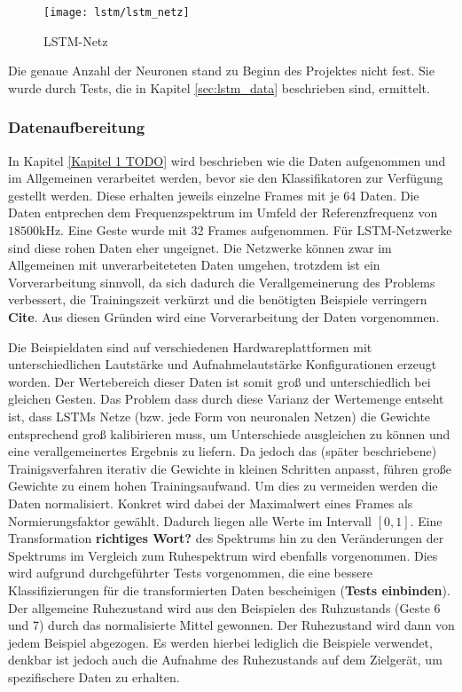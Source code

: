 \begin{figure}[htbp]
    \centering
   \texttt{[image: lstm/lstm\_netz]}
\caption{LSTM-Netz}
\label{fig:lstm_netz}
\end{figure}
Die genaue Anzahl der Neuronen stand zu Beginn des Projektes nicht fest. 
Sie wurde durch Tests, die in Kapitel \autoref{sec:lstm_data} beschrieben sind, ermittelt.

\subsubsection{Datenaufbereitung}
\label{sec:lstm_data}

In Kapitel \ref{Kapitel 1 TODO} wird beschrieben wie die Daten aufgenommen und
im Allgemeinen verarbeitet werden, bevor sie den Klassifikatoren zur
Verfügung gestellt werden. Diese erhalten jeweils einzelne Frames mit je 64
Daten. Die Daten entprechen dem Frequenzspektrum im Umfeld der
Referenzfrequenz von $18500\text{kHz}$. Eine Geste wurde mit 32 Frames
aufgenommen. Für \ac{LSTM}-Netzwerke sind diese rohen Daten eher ungeignet. Die
Netzwerke können zwar im Allgemeinen mit unverarbeiteteten Daten umgehen,
trotzdem ist ein Vorverarbeitung sinnvoll, da sich dadurch die Verallgemeinerung
des Problems verbessert, die Trainingszeit verkürzt und die benötigten Beispiele
verringern \textbf{Cite}. Aus diesen Gründen wird eine Vorverarbeitung der Daten
vorgenommen. 

Die Beispieldaten sind auf verschiedenen Hardwareplattformen mit
unterschiedlichen Lautstärke und Aufnahmelautstärke Konfigurationen erzeugt
worden. Der Wertebereich dieser Daten ist somit groß und unterschiedlich bei
gleichen Gesten. Das Problem dass durch diese Varianz der Wertemenge entseht
ist, dass \acp{LSTM} Netze (bzw. jede Form von neuronalen Netzen) die Gewichte
entsprechend groß kalibirieren muss, um Unterschiede ausgleichen zu können und
eine verallgemeinertes Ergebnis zu liefern. Da jedoch das (später beschriebene)
Trainigsverfahren iterativ die Gewichte in kleinen Schritten anpasst, führen
große Gewichte zu einem hohen Trainingsaufwand. Um dies zu vermeiden werden die
Daten normalisiert. Konkret wird dabei der Maximalwert eines Frames als
Normierungsfaktor gewählt. Dadurch liegen alle Werte im Intervall $[0,1]$.
Eine Transformation \textbf{richtiges Wort?} des Spektrums hin zu den
Veränderungen der Spektrums im Vergleich zum Ruhespektrum wird ebenfalls
vorgenommen. Dies wird aufgrund durchgeführter Tests vorgenommen, die eine
bessere Klassifizierungen für die transformierten Daten bescheinigen
(\textbf{Tests einbinden}). Der allgemeine Ruhezustand wird aus den Beispielen
des Ruhzustands (Geste 6 und 7) durch das normalisierte Mittel gewonnen. Der
Ruhezustand wird dann von jedem Beispiel abgezogen. Es werden hierbei lediglich
die Beispiele verwendet, denkbar ist jedoch auch die Aufnahme des Ruhezustands
auf dem Zielgerät, um spezifischere Daten zu erhalten. 

